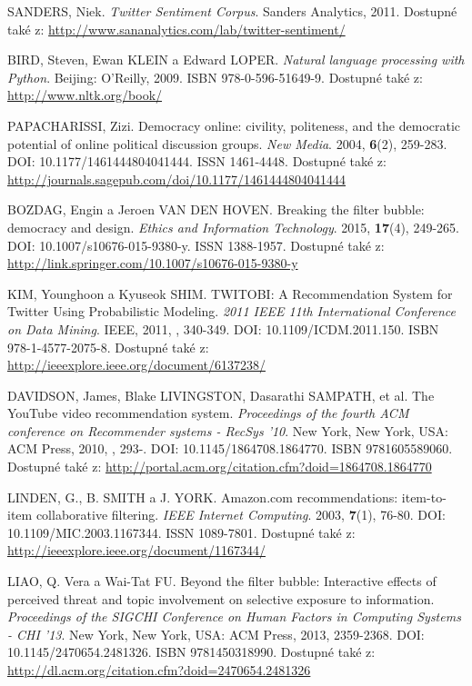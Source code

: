 \documentclass[12pt, a4paper]{article}
\numberwithin{equation}{section} 	%
\begin{document}
\begin{thebibliography}{99}
    SANDERS, Niek. \textit{Twitter Sentiment Corpus}. Sanders Analytics, 2011. Dostupné také z: \url{http://www.sananalytics.com/lab/twitter-sentiment/}

    BIRD, Steven, Ewan KLEIN a Edward LOPER. \textit{Natural language processing with Python}. Beijing: O'Reilly, 2009. ISBN 978-0-596-51649-9. Dostupné také z: \url{http://www.nltk.org/book/}

    PAPACHARISSI, Zizi. Democracy online: civility, politeness, and the democratic potential of online political discussion groups. \textit{New Media}. 2004, \textbf{6}(2), 259-283. DOI: 10.1177/1461444804041444. ISSN 1461-4448. Dostupné také z: \url{http://journals.sagepub.com/doi/10.1177/1461444804041444}

    BOZDAG, Engin a Jeroen VAN DEN HOVEN. Breaking the filter bubble: democracy and design. \textit{Ethics and Information Technology}. 2015, \textbf{17}(4), 249-265. DOI: 10.1007/s10676-015-9380-y. ISSN 1388-1957. Dostupné také z: \url{http://link.springer.com/10.1007/s10676-015-9380-y}

    KIM, Younghoon a Kyuseok SHIM. TWITOBI: A Recommendation System for Twitter Using Probabilistic Modeling. \textit{2011 IEEE 11th International Conference on Data Mining}. IEEE, 2011, , 340-349. DOI: 10.1109/ICDM.2011.150. ISBN 978-1-4577-2075-8. Dostupné také z: \url{http://ieeexplore.ieee.org/document/6137238/}

    DAVIDSON, James, Blake LIVINGSTON, Dasarathi SAMPATH, et al. The YouTube video recommendation system. \textit{Proceedings of the fourth ACM conference on Recommender systems - RecSys '10}. New York, New York, USA: ACM Press, 2010, , 293-. DOI: 10.1145/1864708.1864770. ISBN 9781605589060. Dostupné také z: \url{http://portal.acm.org/citation.cfm?doid=1864708.1864770}

    LINDEN, G., B. SMITH a J. YORK. Amazon.com recommendations: item-to-item collaborative filtering. \textit{IEEE Internet Computing}. 2003, \textbf{7}(1), 76-80. DOI: 10.1109/MIC.2003.1167344. ISSN 1089-7801. Dostupné také z: \url{http://ieeexplore.ieee.org/document/1167344/}

    LIAO, Q. Vera a Wai-Tat FU. Beyond the filter bubble: Interactive effects of perceived threat and topic involvement on selective exposure to information. \textit{Proceedings of the SIGCHI Conference on Human Factors in Computing Systems - CHI '13}. New York, New York, USA: ACM Press, 2013, 2359-2368. DOI: 10.1145/2470654.2481326. ISBN 9781450318990. Dostupné také z: \url{http://dl.acm.org/citation.cfm?doid=2470654.2481326}


\end{thebibliography}
\end{document}
